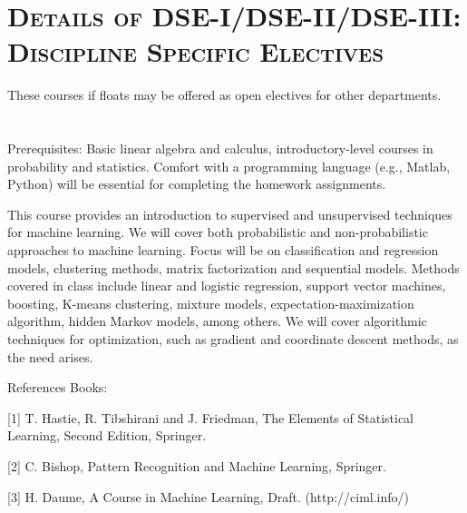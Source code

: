 \section
{\scshape Details of DSE-I/DSE-II/DSE-III: Discipline Specific Electives}

These courses if floats may be offered as open electives for other departments. 


\section{\dsccourseinfo}

Prerequisites: Basic linear algebra and calculus, introductory-level courses in probability and statistics. Comfort with a programming language (e.g., Matlab, Python) will be essential for completing the homework assignments.

This course provides an introduction to supervised and unsupervised techniques for machine learning. We will cover both probabilistic and non-probabilistic approaches to machine learning. Focus will be on classification and regression models, clustering methods, matrix factorization and sequential models. Methods covered in class include linear and logistic regression, support vector machines, boosting, K-means clustering, mixture models, expectation-maximization algorithm, hidden Markov models, among others. We will cover algorithmic techniques for optimization, such as gradient and coordinate descent methods, as the need arises.

References Books: 

[1] T. Hastie, R. Tibshirani and J. Friedman, The Elements of Statistical Learning, Second Edition, Springer.

[2] C. Bishop, Pattern Recognition and Machine Learning, Springer.

[3] H. Daume, A Course in Machine Learning, Draft. (http://ciml.info/)



